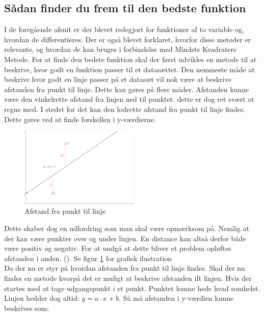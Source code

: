 \subsection{Sådan finder du frem til den bedste funktion}\label{sec:bedsteFunktion}
I de foregående afsnit er der blevet redegjort for funktioner af to variable og, hvordan de differentieres. Der er også blevet forklaret, hvorfor disse metoder er relevante, og hvordan de kan bruges i forbindelse med Mindste Kvadraters Metode. For at finde den bedste funktion skal der først udvikles en metode til at beskrive, hvor godt en funktion passer til et datasættet. Den nemmeste måde at beskrive hvor godt en linje passer på et datasæt vil nok være at beskrive afstanden fra punkt til linje. Dette kan gøres på flere måder. Afstanden kunne være den vinkelrette afstand fra linjen ned til punktet. dette er dog ret svært at regne med. I stedet for det kan den lodrette afstand fra punkt til linje findes. Dette gøres ved at finde forskellen i y-værdierne.
\begin{figure}
    \centering
    \includegraphics[width=0.5\textwidth]{figures/afstand.png}
    \caption{Afstand fra punkt til linje}
    \label{fig:afstandFraLinjeTilPunkt}
\end{figure}   
Dette skaber dog en udfordring som man skal være opmærksom på. Nemlig at der kan være punkter over og under linjen. En distance kan altså derfor både være positiv og negativ. For at undgå at dette bliver et problem opløftes afstanden i anden. (\cite[2]{ForberedelsessetMaj2013}). Se figur \ref{fig:afstandFraLinjeTilPunkt} for grafisk ilustration \\ Da der nu er styr på hvordan afstanden fra punkt til linje findes. Skal der nu findes en metode hvorpå det er muligt at beskrive afstanden ift linjen. Hvis der startes med at tage udgangspunkt i et punkt. Punktet kunne hede hvad somhelst. Linjen hedder dog altid: $y = a \cdot x + b$. Så må afstanden i y-værdien kunne beskrives som:  
